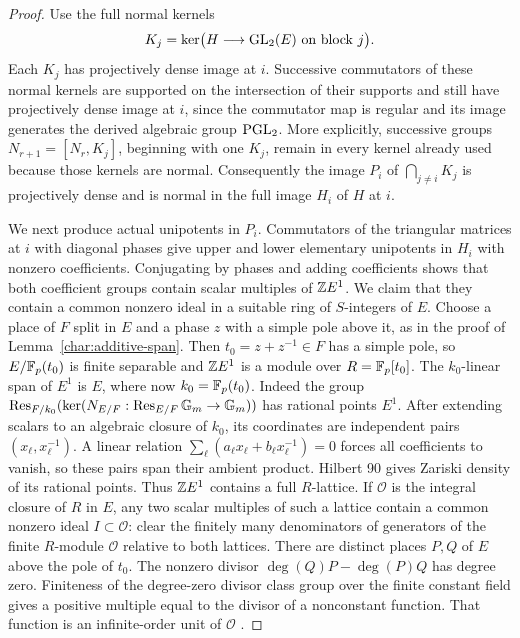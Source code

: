 \begin{proof}
Use the full normal kernels
\[
 K_j=\ker\bigl(H\longrightarrow\operatorname{GL}_2(E)
                    \text{ on block }j\bigr).
\]
Each $K_j$ has projectively dense image at $i$. Successive commutators
of these normal kernels are supported on the intersection of their
supports and still have projectively dense image at $i$, since
the commutator map is regular and its image generates the derived
algebraic group $\operatorname{PGL}_2$. More explicitly, successive groups
$N_{r+1}=[N_r,K_j]$, beginning with one $K_j$, remain in every kernel
already used because those kernels are normal. Consequently the image $P_i$ of
$\bigcap_{j\ne i}K_j$ is projectively dense and is normal in the full
image $H_i$ of $H$ at $i$.

We next produce actual unipotents in $P_i$. Commutators of the
triangular matrices at $i$ with diagonal phases give upper and lower
elementary unipotents in $H_i$ with nonzero coefficients. Conjugating
by phases and adding coefficients shows that both coefficient groups
contain scalar multiples of $\mathbb Z E^1$. We claim that they contain a
common nonzero ideal in a suitable ring of $S$-integers of $E$.
Choose a place of $F$ split in $E$ and a phase $z$ with a simple pole
above it, as in the proof of Lemma~\ref{char:additive-span}. Then
$t_0=z+z^{-1}\in F$ has a simple pole, so $E/\mathbb F_p(t_0)$ is finite
separable and $\mathbb Z E^1$ is a module over $R=\mathbb F_p[t_0]$.
The $k_0$-linear span of $E^1$ is $E$, where now
$k_0=\mathbb F_p(t_0)$. Indeed the group
$\operatorname{Res}_{F/k_0}(\ker(N_{E/F}:\operatorname{Res}_{E/F}\mathbb G_m\to\mathbb G_m))$
has rational points $E^1$. After extending scalars to an algebraic
closure of $k_0$, its coordinates are
independent pairs $(x_\ell,x_\ell^{-1})$. A linear relation
$\sum_\ell(a_\ell x_\ell+b_\ell x_\ell^{-1})=0$ forces all
coefficients to vanish, so these pairs span their ambient product.
Hilbert 90 gives Zariski density of its rational points. Thus
$\mathbb Z E^1$ contains a full $R$-lattice. If $\mathcal O$ is the
integral closure of $R$ in $E$, any two scalar multiples of such a
lattice contain a common nonzero ideal $I\subset\mathcal O$:
clear the finitely many denominators of generators of the finite
$R$-module $\mathcal O$ relative to both lattices.
There are distinct places $P,Q$ of $E$ above the pole of $t_0$.
The nonzero divisor $\deg(Q)P-\deg(P)Q$ has degree zero. Finiteness
of the degree-zero divisor class group over the finite constant field
gives a positive multiple equal to the divisor of a nonconstant
function. That function is an infinite-order unit of $\mathcal O$
\cite[Chapter~14]{Rosen2002}.


\end{proof}
